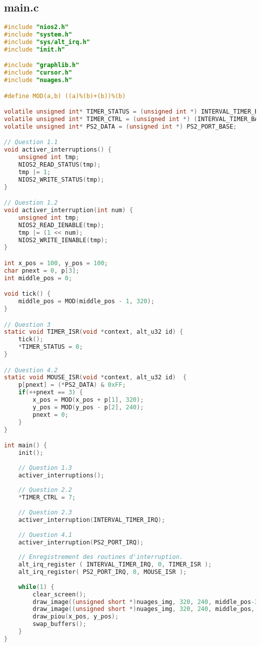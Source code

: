 \documentclass[a4paper,11pt]{article}
\begin{document}
\newpage
\subsection*{main.c}
\begin{lstlisting}[language=C]
#include "nios2.h"
#include "system.h"
#include "sys/alt_irq.h"
#include "init.h"

#include "graphlib.h"
#include "cursor.h"
#include "nuages.h"

#define MOD(a,b) ((a)%(b)+(b))%(b)

volatile unsigned int* TIMER_STATUS = (unsigned int *) INTERVAL_TIMER_BASE;
volatile unsigned int* TIMER_CTRL = (unsigned int *) (INTERVAL_TIMER_BASE + 4);
volatile unsigned int* PS2_DATA = (unsigned int *) PS2_PORT_BASE;

// Question 1.1
void activer_interruptions() {
	unsigned int tmp;
	NIOS2_READ_STATUS(tmp);
	tmp |= 1;
	NIOS2_WRITE_STATUS(tmp);
}

// Question 1.2
void activer_interruption(int num) {
	unsigned int tmp;
	NIOS2_READ_IENABLE(tmp);
	tmp |= (1 << num);
	NIOS2_WRITE_IENABLE(tmp);
}

int x_pos = 100, y_pos = 100;
char pnext = 0, p[3];
int middle_pos = 0;

void tick() {
	middle_pos = MOD(middle_pos - 1, 320);
}

// Question 3
static void TIMER_ISR(void *context, alt_u32 id) {
	tick();
	*TIMER_STATUS = 0;
}

// Question 4.2
static void MOUSE_ISR(void *context, alt_u32 id)  {
	p[pnext] = (*PS2_DATA) & 0xFF;
	if(++pnext == 3) {
		x_pos = MOD(x_pos + p[1], 320);
		y_pos = MOD(y_pos - p[2], 240);
		pnext = 0;
	}
}

int main() {
	init();
	
	// Question 1.3
	activer_interruptions();
	
	// Question 2.2
	*TIMER_CTRL = 7;
	
	// Question 2.3
	activer_interruption(INTERVAL_TIMER_IRQ);
	
	// Question 4.1
	activer_interruption(PS2_PORT_IRQ);
	
	// Enregistrement des routines d'interruption.
	alt_irq_register ( INTERVAL_TIMER_IRQ, 0, TIMER_ISR );
	alt_irq_register( PS2_PORT_IRQ, 0, MOUSE_ISR );
	
	while(1) {
		clear_screen();
		draw_image((unsigned short *)nuages_img, 320, 240, middle_pos-320, 0);
		draw_image((unsigned short *)nuages_img, 320, 240, middle_pos, 0);
		draw_piou(x_pos, y_pos);
		swap_buffers();
	}
}
\end{lstlisting}
\end{document}
